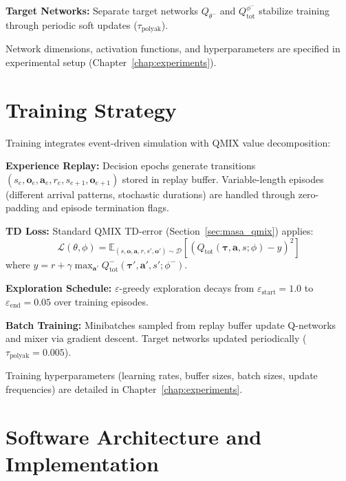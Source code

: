 \textbf{Target Networks:} Separate target networks \( Q_{\theta^-} \) and \( Q_{\text{tot}}^{\phi^-} \) stabilize training through periodic soft updates (\( \tau_{\text{polyak}} \)).

Network dimensions, activation functions, and hyperparameters are specified in experimental setup (Chapter~\ref{chap:experiments}).


\section{Training Strategy}
\label{sec:training_strategy}

Training integrates event-driven simulation with QMIX value decomposition:

\textbf{Experience Replay:} Decision epochs generate transitions \( (s_e, \mathbf{o}_e, \mathbf{a}_e, r_e, s_{e+1}, \mathbf{o}_{e+1}) \) stored in replay buffer. Variable-length episodes (different arrival patterns, stochastic durations) are handled through zero-padding and episode termination flags.

\textbf{TD Loss:} Standard QMIX TD-error (Section~\ref{sec:masa_qmix}) applies:
\[
\mathcal{L}(\theta, \phi) = \mathbb{E}_{(s, \mathbf{o}, \mathbf{a}, r, s', \mathbf{o}') \sim \mathcal{D}} \left[ \left( Q_{\text{tot}}(\boldsymbol{\tau}, \mathbf{a}, s; \phi) - y \right)^2 \right]
\]
where \( y = r + \gamma \max_{\mathbf{a}'} Q_{\text{tot}}^-(\boldsymbol{\tau}', \mathbf{a}', s'; \phi^-) \).

\textbf{Exploration Schedule:} \( \varepsilon \)-greedy exploration decays from \( \varepsilon_{\text{start}} = 1.0 \) to \( \varepsilon_{\text{end}} = 0.05 \) over training episodes.

\textbf{Batch Training:} Minibatches sampled from replay buffer update Q-networks and mixer via gradient descent. Target networks updated periodically (\( \tau_{\text{polyak}} = 0.005 \)).

Training hyperparameters (learning rates, buffer sizes, batch sizes, update frequencies) are detailed in Chapter~\ref{chap:experiments}.


\section{Software Architecture and Implementation}
\label{sec:implementation}

